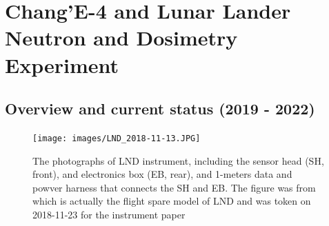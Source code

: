 \section{Chang'E-4 and Lunar Lander Neutron and Dosimetry Experiment}
\label{sec:change_4_LND}

\subsection{Overview and current status (2019 - 2022)}

\begin{figure}
    \centering
    \texttt{[image: images/LND\_2018-11-13.JPG]}
    \caption[Photograph of Lunar Lander neutron dosimetry experiment]{The photographs of LND instrument, including the sensor head (SH, front), and electronics box (EB, rear), and 1-meters data and powver harness that connects the SH and EB. The figure was from \citet{Wimmer-2020-LND} which is actually the flight spare model of LND and was token on 2018-11-23 for the instrument paper}
    \label{Fig:LND_instrument}
\end{figure}

